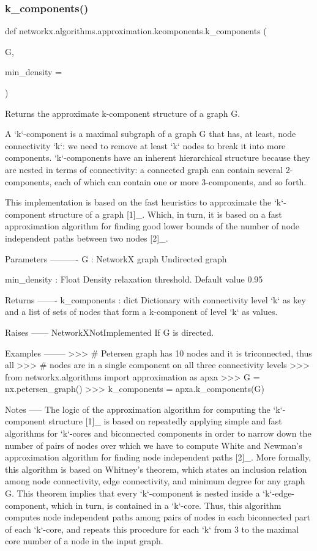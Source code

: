 \subsubsection{\texorpdfstring{k\+\_\+components()}{k\_components()}}
{\footnotesize\ttfamily def networkx.\+algorithms.\+approximation.\+kcomponents.\+k\+\_\+components (\begin{DoxyParamCaption}\item[{}]{G,  }\item[{}]{min\+\_\+density = {} }\end{DoxyParamCaption})}

\begin{DoxyVerb}Returns the approximate k-component structure of a graph G.

A `k`-component is a maximal subgraph of a graph G that has, at least,
node connectivity `k`: we need to remove at least `k` nodes to break it
into more components. `k`-components have an inherent hierarchical
structure because they are nested in terms of connectivity: a connected
graph can contain several 2-components, each of which can contain
one or more 3-components, and so forth.

This implementation is based on the fast heuristics to approximate
the `k`-component structure of a graph [1]_. Which, in turn, it is based on
a fast approximation algorithm for finding good lower bounds of the number
of node independent paths between two nodes [2]_.

Parameters
----------
G : NetworkX graph
    Undirected graph

min_density : Float
    Density relaxation threshold. Default value 0.95

Returns
-------
k_components : dict
    Dictionary with connectivity level `k` as key and a list of
    sets of nodes that form a k-component of level `k` as values.

Raises
------
NetworkXNotImplemented
    If G is directed.

Examples
--------
>>> # Petersen graph has 10 nodes and it is triconnected, thus all
>>> # nodes are in a single component on all three connectivity levels
>>> from networkx.algorithms import approximation as apxa
>>> G = nx.petersen_graph()
>>> k_components = apxa.k_components(G)

Notes
-----
The logic of the approximation algorithm for computing the `k`-component
structure [1]_ is based on repeatedly applying simple and fast algorithms
for `k`-cores and biconnected components in order to narrow down the
number of pairs of nodes over which we have to compute White and Newman's
approximation algorithm for finding node independent paths [2]_. More
formally, this algorithm is based on Whitney's theorem, which states
an inclusion relation among node connectivity, edge connectivity, and
minimum degree for any graph G. This theorem implies that every
`k`-component is nested inside a `k`-edge-component, which in turn,
is contained in a `k`-core. Thus, this algorithm computes node independent
paths among pairs of nodes in each biconnected part of each `k`-core,
and repeats this procedure for each `k` from 3 to the maximal core number
of a node in the input graph.


\end{DoxyVerb}

